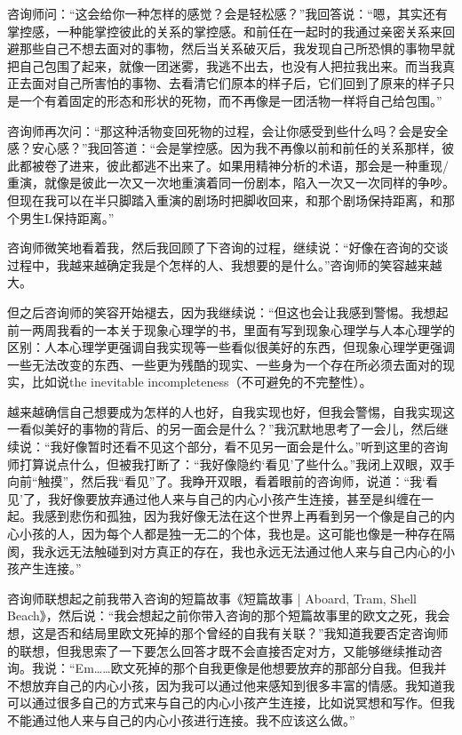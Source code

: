 咨询师问：“这会给你一种怎样的感觉？会是轻松感？”我回答说：“嗯，其实还有掌控感，一种能掌控彼此的关系的掌控感。和前任在一起时的我通过亲密关系来回避那些自己不想去面对的事物，然后当关系破灭后，我发现自己所恐惧的事物早就把自己包围了起来，就像一团迷雾，我逃不出去，也没有人把拉我出来。而当我真正去面对自己所害怕的事物、去看清它们原本的样子后，它们回到了原来的样子\pozhehao{}只是一个有着固定的形态和形状的死物，而不再像是一团活物一样将自己给包围。”

咨询师再次问：“那这种活物变回死物的过程，会让你感受到些什么吗？会是安全感？安心感？”我回答道：“会是掌控感。因为我不再像以前和前任的关系那样，彼此都被卷了进来，彼此都逃不出来了。如果用精神分析的术语，那会是一种重现/重演，就像是彼此一次又一次地重演着同一份剧本，陷入一次又一次同样的争吵。但现在我可以在半只脚踏入重演的剧场时把脚收回来，和那个剧场保持距离，和那个男生L保持距离。”

咨询师微笑地看着我，然后我回顾了下咨询的过程，继续说：“好像在咨询的交谈过程中，我越来越确定我是个怎样的人、我想要的是什么。”咨询师的笑容越来越大。

\tristarsepline



但之后咨询师的笑容开始褪去，因为我继续说：“但这也会让我感到警惕。我想起前一两周我看的一本关于现象心理学的书，里面有写到现象心理学与人本心理学的区别：人本心理学更强调自我实现等一些看似很美好的东西，但现象心理学更强调一些无法改变的东西、一些更为残酷的现实、一些身为一个存在所必须去面对的现实，比如说the inevitable incompleteness（不可避免的不完整性）。  

越来越确信自己想要成为怎样的人也好，自我实现也好，但我会警惕，自我实现这一看似美好的事物的背后、的另一面会是什么？”我沉默地思考了一会儿，然后继续说：“我好像暂时还看不见这个部分，看不见另一面会是什么。”听到这里的咨询师打算说点什么，但被我打断了：“我好像隐约‘看见’了些什么。”我闭上双眼，双手向前“触摸”，然后我“看见”了。我睁开双眼，看着眼前的咨询师，说道：“我‘看见’了，我好像要放弃通过他人来与自己的内心小孩产生连接，甚至是纠缠在一起。我感到悲伤和孤独，因为我好像无法在这个世界上再看到另一个像是自己的内心小孩的人，因为每个人都是独一无二的个体，我也是。这可能也像是一种存在隔阂，我永远无法触碰到对方真正的存在，我也永远无法通过他人来与自己内心的小孩产生连接。”

咨询师联想起之前我带入咨询的短篇故事《短篇故事 | Aboard, Tram, Shell Beach》，然后说：“我会想起之前你带入咨询的那个短篇故事里的欧文之死，我会想，这是否和结局里欧文死掉的那个曾经的自我有关联？”我知道我要否定咨询师的联想，但我思索了一下要怎么回答才既不会直接否定对方，又能够继续推动咨询。我说：“Em……欧文死掉的那个自我更像是他想要放弃的那部分自我。但我并不想放弃自己的内心小孩，因为我可以通过他来感知到很多丰富的情感。我知道我可以通过很多自己的方式来与自己的内心小孩产生连接，比如说冥想和写作。但我不能通过他人来与自己的内心小孩进行连接。我不应该这么做。”

